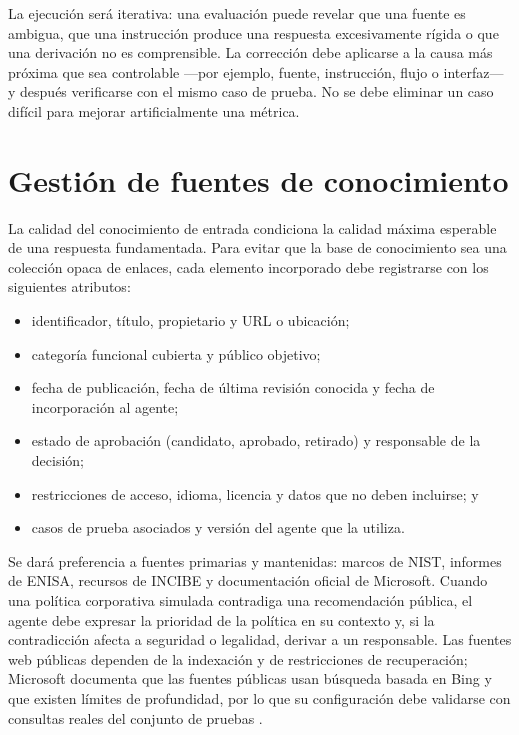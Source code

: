 La ejecución será iterativa: una evaluación puede revelar que una fuente es
ambigua, que una instrucción produce una respuesta excesivamente rígida o que una
derivación no es comprensible. La corrección debe aplicarse a la causa más
próxima que sea controlable ---por ejemplo, fuente, instrucción, flujo o
interfaz--- y después verificarse con el mismo caso de prueba. No se debe
eliminar un caso difícil para mejorar artificialmente una métrica.

\section{Gestión de fuentes de conocimiento}
\label{sec:gestion-fuentes}

La calidad del conocimiento de entrada condiciona la calidad máxima esperable de
una respuesta fundamentada. Para evitar que la base de conocimiento sea una
colección opaca de enlaces, cada elemento incorporado debe registrarse con los
siguientes atributos:

\begin{itemize}
  \item identificador, título, propietario y URL o ubicación;
  \item categoría funcional cubierta y público objetivo;
  \item fecha de publicación, fecha de última revisión conocida y fecha de
  incorporación al agente;
  \item estado de aprobación (candidato, aprobado, retirado) y responsable de la
  decisión;
  \item restricciones de acceso, idioma, licencia y datos que no deben incluirse;
  y
  \item casos de prueba asociados y versión del agente que la utiliza.
\end{itemize}

Se dará preferencia a fuentes primarias y mantenidas: marcos de NIST, informes de
ENISA, recursos de INCIBE y documentación oficial de Microsoft. Cuando una
política corporativa simulada contradiga una recomendación pública, el agente
debe expresar la prioridad de la política en su contexto y, si la contradicción
afecta a seguridad o legalidad, derivar a un responsable. Las fuentes web
públicas dependen de la indexación y de restricciones de recuperación; Microsoft
documenta que las fuentes públicas usan búsqueda basada en Bing y que existen
límites de profundidad, por lo que su configuración debe validarse con consultas
reales del conjunto de pruebas \cite{copilotPublicWeb}.

